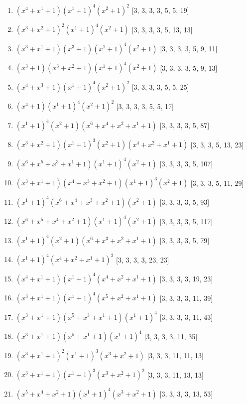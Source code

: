 \documentclass[10pt,twocolumn]{article}
\begin{document}
\begin{enumerate}
\item $(x^{4} + x^{1} + 1)(x^{1} + 1)^{4}(x^{2} + 1)^{2}$  [3, 3, 3, 3, 5, 5, 19]
\item $(x^{3} + x^{2} + 1)^{2}(x^{1} + 1)^{4}(x^{2} + 1)$  [3, 3, 3, 3, 5, 13, 13]
\item $(x^{3} + x^{1} + 1)(x^{3} + 1)(x^{1} + 1)^{4}(x^{2} + 1)$  [3, 3, 3, 3, 5, 9, 11]
\item $(x^{3} + 1)(x^{3} + x^{2} + 1)(x^{1} + 1)^{4}(x^{2} + 1)$  [3, 3, 3, 3, 5, 9, 13]
\item $(x^{4} + x^{3} + 1)(x^{1} + 1)^{4}(x^{2} + 1)^{2}$  [3, 3, 3, 3, 5, 5, 25]
\item $(x^{4} + 1)(x^{1} + 1)^{4}(x^{2} + 1)^{2}$  [3, 3, 3, 3, 5, 5, 17]
\item $(x^{1} + 1)^{4}(x^{2} + 1)(x^{6} + x^{4} + x^{2} + x^{1} + 1)$  [3, 3, 3, 3, 5, 87]
\item $(x^{3} + x^{2} + 1)(x^{1} + 1)^{3}(x^{2} + 1)(x^{4} + x^{2} + x^{1} + 1)$  [3, 3, 3, 5, 13, 23]
\item $(x^{6} + x^{5} + x^{3} + x^{1} + 1)(x^{1} + 1)^{4}(x^{2} + 1)$  [3, 3, 3, 3, 5, 107]
\item $(x^{3} + x^{1} + 1)(x^{4} + x^{3} + x^{2} + 1)(x^{1} + 1)^{3}(x^{2} + 1)$  [3, 3, 3, 5, 11, 29]
\item $(x^{1} + 1)^{4}(x^{6} + x^{4} + x^{3} + x^{2} + 1)(x^{2} + 1)$  [3, 3, 3, 3, 5, 93]
\item $(x^{6} + x^{5} + x^{4} + x^{2} + 1)(x^{1} + 1)^{4}(x^{2} + 1)$  [3, 3, 3, 3, 5, 117]
\item $(x^{1} + 1)^{4}(x^{2} + 1)(x^{6} + x^{3} + x^{2} + x^{1} + 1)$  [3, 3, 3, 3, 5, 79]
\item $(x^{1} + 1)^{4}(x^{4} + x^{2} + x^{1} + 1)^{2}$  [3, 3, 3, 3, 23, 23]
\item $(x^{4} + x^{1} + 1)(x^{1} + 1)^{4}(x^{4} + x^{2} + x^{1} + 1)$  [3, 3, 3, 3, 19, 23]
\item $(x^{3} + x^{1} + 1)(x^{1} + 1)^{4}(x^{5} + x^{2} + x^{1} + 1)$  [3, 3, 3, 3, 11, 39]
\item $(x^{3} + x^{1} + 1)(x^{5} + x^{3} + x^{1} + 1)(x^{1} + 1)^{4}$  [3, 3, 3, 3, 11, 43]
\item $(x^{3} + x^{1} + 1)(x^{5} + x^{1} + 1)(x^{1} + 1)^{4}$  [3, 3, 3, 3, 11, 35]
\item $(x^{3} + x^{1} + 1)^{2}(x^{1} + 1)^{3}(x^{3} + x^{2} + 1)$  [3, 3, 3, 11, 11, 13]
\item $(x^{3} + x^{1} + 1)(x^{1} + 1)^{3}(x^{3} + x^{2} + 1)^{2}$  [3, 3, 3, 11, 13, 13]
\item $(x^{5} + x^{4} + x^{2} + 1)(x^{1} + 1)^{4}(x^{3} + x^{2} + 1)$  [3, 3, 3, 3, 13, 53]

\end{enumerate}
\end{document}
